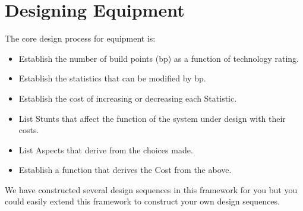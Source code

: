 \section{Designing Equipment}\label{sec:Designing Equipment} %

The core design process for equipment is:
\begin{itemize}
\item Establish the number of build points (bp) as a function of technology rating.
\item Establish the statistics that can be modified by bp.
\item Establish the cost of increasing or decreasing each Statistic.
\item List Stunts that affect the function of the system under design with their
costs.
\item List Aspects that derive from the choices made.
\item Establish a function that derives the Cost from the above.
\end{itemize}

We have constructed several design sequences in this framework for you but you
could easily extend this framework to construct your own design sequences.

